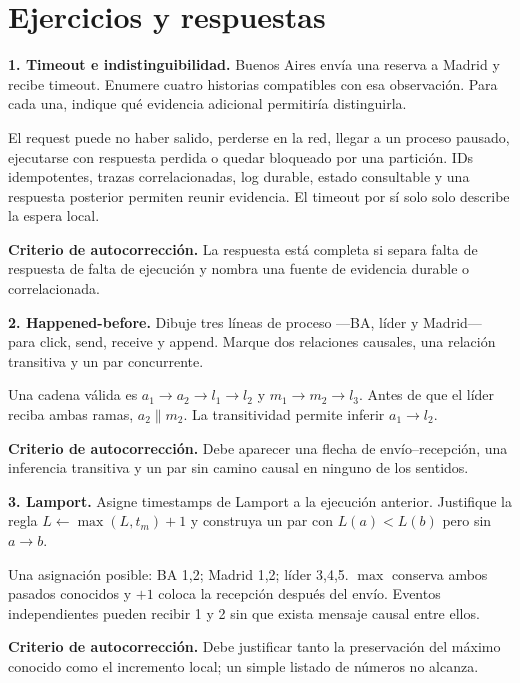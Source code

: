 \documentclass[variant=guiaresuelta,cover=institutional,mode=screen]{ua-engineering-v6-article}
\begin{document}
\section{Ejercicios y respuestas}
\begin{uaexercise}
\textbf{1. Timeout e indistinguibilidad.} Buenos Aires envía una reserva a Madrid y recibe timeout. Enumere cuatro historias compatibles con esa observación. Para cada una, indique qué evidencia adicional permitiría distinguirla.
\end{uaexercise}
\begin{uaanswer}
El request puede no haber salido, perderse en la red, llegar a un proceso pausado, ejecutarse con respuesta perdida o quedar bloqueado por una partición. IDs idempotentes, trazas correlacionadas, log durable, estado consultable y una respuesta posterior permiten reunir evidencia. El timeout por sí solo solo describe la espera local.

\par\smallskip\textbf{Criterio de autocorrección.} La respuesta está completa si separa falta de respuesta de falta de ejecución y nombra una fuente de evidencia durable o correlacionada.
\end{uaanswer}

\begin{uaexercise}
\textbf{2. Happened-before.} Dibuje tres líneas de proceso ---BA, líder y Madrid--- para click, send, receive y append. Marque dos relaciones causales, una relación transitiva y un par concurrente.
\end{uaexercise}
\begin{uaanswer}
Una cadena válida es $a_1\rightarrow a_2\rightarrow l_1\rightarrow l_2$ y $m_1\rightarrow m_2\rightarrow l_3$. Antes de que el líder reciba ambas ramas, $a_2\parallel m_2$. La transitividad permite inferir $a_1\rightarrow l_2$.

\par\smallskip\textbf{Criterio de autocorrección.} Debe aparecer una flecha de envío--recepción, una inferencia transitiva y un par sin camino causal en ninguno de los sentidos.
\end{uaanswer}

\begin{uaexercise}
\textbf{3. Lamport.} Asigne timestamps de Lamport a la ejecución anterior. Justifique la regla $L\leftarrow\max(L,t_m)+1$ y construya un par con $L(a)<L(b)$ pero sin $a\rightarrow b$.
\end{uaexercise}
\begin{uaanswer}
Una asignación posible: BA 1,2; Madrid 1,2; líder 3,4,5. $\max$ conserva ambos pasados conocidos y $+1$ coloca la recepción después del envío. Eventos independientes pueden recibir 1 y 2 sin que exista mensaje causal entre ellos.

\par\smallskip\textbf{Criterio de autocorrección.} Debe justificar tanto la preservación del máximo conocido como el incremento local; un simple listado de números no alcanza.
\end{uaanswer}
\end{document}
